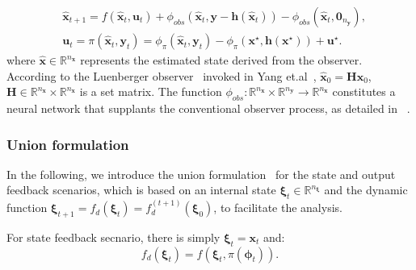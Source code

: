 \documentclass[conference]{IEEEtran}
\newcommand{\myvec}[1]{\boldsymbol{#1}}
\newcommand{\mymatrix}[1]{\boldsymbol{#1}}
\newcommand{\bbR}{\mathbb{R}}
\begin{document}
\begin{subequations}
  \begin{align}
    &\hat{\myvec{x}}_{t+1} = 
    f(\hat{\myvec{x}}_{t}, \myvec{u}_{t}) + 
    \phi_{obs}(\hat{\myvec{x}}_{t}, \myvec{y} - \myvec{h}(\hat{\myvec{x}}_{t})) 
    - \phi_{obs}(\hat{\myvec{x}}_{t}, \myvec{0}_{n_{\myvec{y}}}), \label{eq:output_feedback_state} \\
    &\myvec{u}_{t} = \pi(\hat{\myvec{x}}_{t}, \myvec{y}_{t}) = 
    \phi_{\pi}(\hat{\myvec{x}}_{t},\myvec{y}_{t}) - 
    \phi_{\pi}(\myvec{x}^{\star},\myvec{h}(\myvec{x}^{\star})) + 
    \myvec{u}^{\star}. \label{eq:output_feedback_control}
  \end{align}
\end{subequations}
where $\hat{\myvec{x}}\in \bbR^{n_{\myvec{x}}}$ 
represents the estimated state derived from the observer. 
According to the Luenberger 
observer~\cite{luenberger1971introduction} 
invoked in Yang et.al~\cite{yanglyapunov}, 
$\hat{\myvec{x}}_{0} = \mymatrix{H}\myvec{x}_{0}$, 
$\mymatrix{H}\in \bbR^{n_{\myvec{x}}} \times \bbR^{n_{\myvec{x}}}$ 
is a set matrix. 
The function $\phi_{obs}:\bbR^{n_{\myvec{x}}} \times 
\bbR^{n_{\myvec{y}}} 
\to \bbR^{n_{\myvec{x}}}$ constitutes a neural network 
that supplants the conventional observer process, 
as detailed in ~\cite{luenberger1971introduction}. 

\subsubsection{Union formulation}
In the following, 
we introduce the union formulation~\cite{yanglyapunov} 
for the state and output feedback scenarios, 
which is based on an internal state 
$\myvec{\xi}_{t} \in \bbR^{n_{\myvec{\xi}}}$ 
and the dynamic function 
$\myvec{\xi}_{t+1}=f_{d}(\myvec{\xi}_{t})=
f_{d}^{(t+1)}(\myvec{\xi}_{0})$, 
to facilitate the analysis. 

For state feedback secnario, 
there is simply $\myvec{\xi}_{t} = \myvec{x}_{t}$ and:
\begin{equation}\label{eq:state_feedback_dynamic}
  f_{d}(\myvec{\xi}_{t}) = 
  f(\myvec{\xi}_{t}, \pi(\myvec{\phi}_{t})).
\end{equation}
\end{document}

